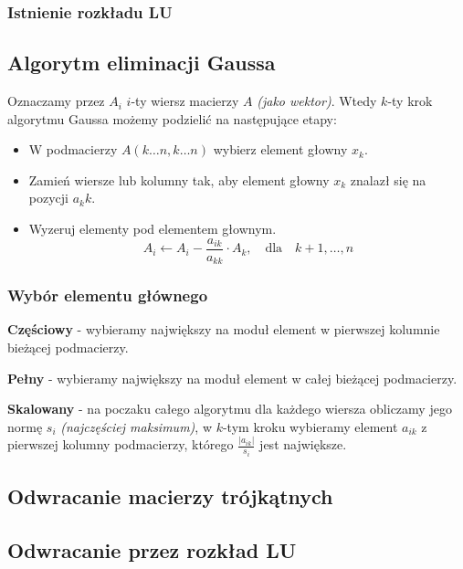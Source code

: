 \documentclass[../mn-notatki.tex]{subfiles}
\begin{document}
\subsubsection{Istnienie rozkładu LU}

\subsection{Algorytm eliminacji Gaussa}

Oznaczamy przez $A_i$ $i$-ty wiersz macierzy $A$ \textit{(jako wektor)}.
Wtedy $k$-ty krok algorytmu Gaussa możemy podzielić na następujące etapy:
\begin{itemize}
    \item W podmacierzy $A(k\ldots n, k\ldots n)$ wybierz element głowny $x_k$.
    \item Zamień wiersze lub kolumny tak, aby element głowny $x_k$ znalazł się
    na pozycji $a_kk$.
    \item Wyzeruj elementy pod elementem głownym.
    \[
    A_i \leftarrow A_i - \frac{a_{ik}}{a_{kk}} \cdot A_k, \text{~~ dla ~~} k+1, \ldots, n
    \]
\end{itemize}

\subsubsection{Wybór elementu głównego}

\begin{tcolorbox}
\textbf{Częściowy} - wybieramy największy na moduł element w pierwszej kolumnie
bieżącej podmacierzy.
\end{tcolorbox}

\begin{tcolorbox}
\textbf{Pełny} - wybieramy największy na moduł element w całej
bieżącej podmacierzy.
\end{tcolorbox}

\begin{tcolorbox}
\textbf{Skalowany} - na poczaku całego algorytmu dla każdego wiersza obliczamy
jego normę $s_i$ \textit{(najczęściej maksimum)}, w $k$-tym kroku wybieramy
element $a_{ik}$ z pierwszej kolumny podmacierzy, którego
$\frac{|a_{ik}|}{s_i}$ jest największe.
\end{tcolorbox}

\subsection{Odwracanie macierzy trójkątnych}
\subsection{Odwracanie przez rozkład LU}
\end{document}
